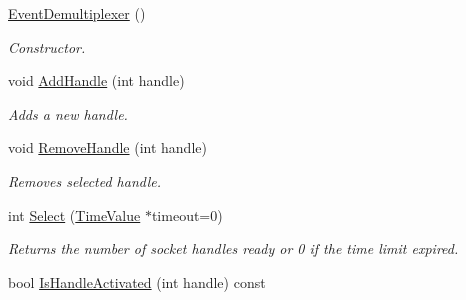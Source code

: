 \begin{DoxyCompactItemize}
\item 
\hypertarget{class_common_1_1_event_demultiplexer_a1049691d966410037859a9f4375fa613}{\hyperlink{class_common_1_1_event_demultiplexer_a1049691d966410037859a9f4375fa613}{Event\-Demultiplexer} ()}\label{class_common_1_1_event_demultiplexer_a1049691d966410037859a9f4375fa613}

\begin{DoxyCompactList}\small\item\em Constructor. \end{DoxyCompactList}\item 
\hypertarget{class_common_1_1_event_demultiplexer_a23812d729f572fd906678cec99f3a2b8}{void \hyperlink{class_common_1_1_event_demultiplexer_a23812d729f572fd906678cec99f3a2b8}{Add\-Handle} (int handle)}\label{class_common_1_1_event_demultiplexer_a23812d729f572fd906678cec99f3a2b8}

\begin{DoxyCompactList}\small\item\em Adds a new handle. \end{DoxyCompactList}\item 
\hypertarget{class_common_1_1_event_demultiplexer_a87eafa05d0a9d188bdc2b1548a656f6b}{void \hyperlink{class_common_1_1_event_demultiplexer_a87eafa05d0a9d188bdc2b1548a656f6b}{Remove\-Handle} (int handle)}\label{class_common_1_1_event_demultiplexer_a87eafa05d0a9d188bdc2b1548a656f6b}

\begin{DoxyCompactList}\small\item\em Removes selected handle. \end{DoxyCompactList}\item 
int \hyperlink{class_common_1_1_event_demultiplexer_a3174a4e1ce07e6ec8875fa8a1dd59379}{Select} (\hyperlink{class_common_1_1_time_value}{Time\-Value} $\ast$timeout=0)
\begin{DoxyCompactList}\small\item\em Returns the number of socket handles ready or 0 if the time limit expired. \end{DoxyCompactList}\item 
\hypertarget{class_common_1_1_event_demultiplexer_a4e4f26eb5cc25fe11ec2a3da90d732f0}{bool \hyperlink{class_common_1_1_event_demultiplexer_a4e4f26eb5cc25fe11ec2a3da90d732f0}{Is\-Handle\-Activated} (int handle) const }\label{class_common_1_1_event_demultiplexer_a4e4f26eb5cc25fe11ec2a3da90d732f0}


\end{DoxyCompactItemize}
